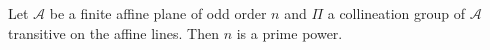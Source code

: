 Let $\mathcal{A}$ be a finite affine plane of odd order $n$ and $\Pi$ a collineation group of $\mathcal{A}$ transitive on the affine lines. Then $n$ is a prime power.
